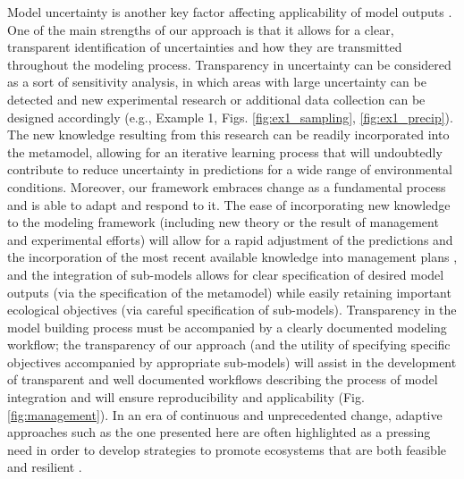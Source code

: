 \documentclass[11pt]{article}
\begin{document}
Model uncertainty is another key factor affecting applicability of model outputs \citep{Addison2013}.
One of the main strengths of our approach is that it allows for a clear, transparent identification of uncertainties and how they are transmitted throughout the modeling process. 
Transparency in uncertainty can be considered as a sort of sensitivity analysis, in which areas with large uncertainty can be detected and new experimental research or additional data collection can be designed accordingly (e.g., Example 1, Figs. \ref{fig:ex1_sampling}, \ref{fig:ex1_precip}).
The new knowledge resulting from this research can be readily incorporated into the metamodel, allowing for an iterative learning process that will undoubtedly contribute to reduce uncertainty in predictions for a wide range of environmental conditions. 
Moreover, our framework embraces change as a fundamental process and is able to adapt and respond to it. 
The ease of incorporating new knowledge to the modeling framework (including new theory or the result of management and experimental efforts) will allow for a rapid adjustment of the predictions and the incorporation of the most recent available knowledge into management plans \citep{Keith2011}, and the integration of sub-models allows for clear specification of desired model outputs (via the specification of the metamodel) while easily retaining important ecological objectives (via careful specification of sub-models).
Transparency in the model building process must be accompanied by a clearly documented modeling workflow; the transparency of our approach (and the utility of specifying specific objectives accompanied by appropriate sub-models) will assist in the development of transparent and well documented workflows describing the process of model integration and will ensure reproducibility and applicability (Fig. \ref{fig:management}). 
In an era of continuous and unprecedented change, adaptive approaches such as the one presented here are often highlighted as a pressing need in order to develop strategies to promote ecosystems that are both feasible and resilient \citep{Seastedt2008, Mori2013}.
\end{document}
